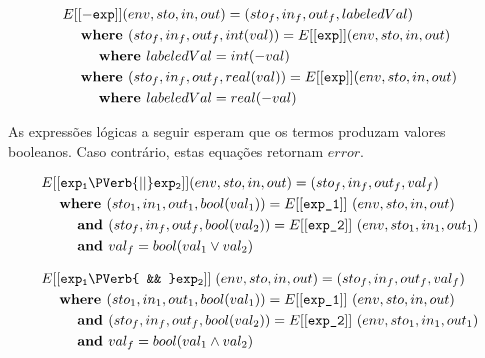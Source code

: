 \documentclass[12pt]{article}
\newcommand\eb[1]{[[\texttt{#1}]]}
\begin{document}
\begin{align*}
&E[[{\tt -exp}]] (env,sto,in,out) = (sto_f,in_f,out_f,labeledVal) \\
&\hspace{3ex}\textbf{where } (sto_f,in_f,out_f,int(val)) = E[[{\tt exp}]] (env,sto,in,out) \\
&\hspace{6ex}\textbf{where } labeledVal = int(-val) \\
&\hspace{3ex}\textbf{where } (sto_f,in_f,out_f,real(val)) = E[[{\tt exp}]] (env,sto,in,out) \\
&\hspace{6ex}\textbf{where } labeledVal = real(-val) \\
\end{align*}

As expressões lógicas a seguir esperam que os termos produzam valores booleanos. Caso contrário, estas equações retornam $error$.

\begin{align*}
&E[[{\tt exp_1 \PVerb{ || } exp_2}]] (env,sto,in,out) = (sto_f,in_f,out_f,val_f)\\
&\hspace{3ex}\textbf{where } (sto_1,in_1,out_1,bool(val_1)) = E\eb{exp\_1}\ (env,sto,in,out) \\
&\hspace{6ex}\textbf{and } (sto_f,in_f,out_f,bool(val_2)) = E\eb{exp\_2}\ (env,sto_1,in_1,out_1) \\
&\hspace{6ex}\textbf{and } val_f = bool(val_1 \lor val_2) \\
\end{align*}

\begin{align*}
&E[[{\tt exp_1 \PVerb{ && } exp_2}]] \;(env,sto,in,out) = (sto_f,in_f,out_f,val_f)\\
&\hspace{3ex}\textbf{where } (sto_1,in_1,out_1,bool(val_1)) = E\eb{exp\_1}\ (env,sto,in,out) \\
&\hspace{6ex}\textbf{and } (sto_f,in_f,out_f,bool(val_2)) = E\eb{exp\_2}\ (env,sto_1,in_1,out_1) \\
&\hspace{6ex}\textbf{and } val_f = bool(val_1 \land val_2) \\
\end{align*}
\end{document}
